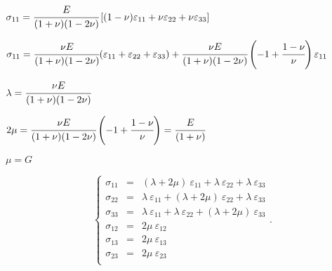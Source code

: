 \documentclass[onecolumn,11pt]{report}
\def\lthtmlcheckvsize{\ifdim\ht\sizebox<\vsize 
  \ifdim\wd\sizebox<\hsize\expandafter\hfill\fi \expandafter\vfill
  \else\expandafter\vss\fi}%
\begin{document}
{\newpage\clearpage
{}%
$\displaystyle \sigma_{11}  = \cfrac{E}{(1+\nu)(1-2\nu)}
\left[ (1-\nu) \varepsilon_{11} + \nu \varepsilon_{22} + \nu \varepsilon_{33} \right]$%
\lthtmlindisplaymathZ
\lthtmlcheckvsize\clearpage}

{\newpage\clearpage
{}%
$\displaystyle \sigma_{11}  = \cfrac{\nu E}{(1+\nu)(1-2\nu)}
(\varepsilon_{11} + \varepsilon_{22} + \varepsilon_{33})
+  \cfrac{\nu E}{(1+\nu)(1-2\nu)} \left( -1 + \cfrac{1-\nu}{\nu} \right) \varepsilon_{11}$%
\lthtmlindisplaymathZ
\lthtmlcheckvsize\clearpage}

{\newpage\clearpage
{}%
$\displaystyle \lambda = \cfrac{\nu E}{(1+\nu)(1-2\nu)}$%
\lthtmlindisplaymathZ
\lthtmlcheckvsize\clearpage}

{\newpage\clearpage
{}%
$\displaystyle 2\mu =  \cfrac{\nu E}{(1+\nu)(1-2\nu)} \left( -1 + \cfrac{1-\nu}{\nu} \right) = \cfrac{E}{(1+\nu)}$%
\lthtmlindisplaymathZ
\lthtmlcheckvsize\clearpage}

{\newpage\clearpage
{}%
$ \mu = G$%
\lthtmlindisplaymathZ
\lthtmlcheckvsize\clearpage}

{\newpage\clearpage
{}%
\begin{displaymath}\left\lbrace
\begin{array}{rcl}
\sigma_{11} & = & (\lambda + 2 \mu) \: \varepsilon_{11} + \lambda \: \varepsilon_{22} + \lambda \: \varepsilon_{33}\\
\sigma_{22} & = & \lambda \: \varepsilon_{11} + (\lambda + 2 \mu) \: \varepsilon_{22} + \lambda \: \varepsilon_{33}\\
\sigma_{33} & = & \lambda \: \varepsilon_{11} + \lambda \: \varepsilon_{22} + (\lambda + 2 \mu) \: \varepsilon_{33}\\
\sigma_{12} & = & 2 \mu \: \varepsilon_{12}\\
\sigma_{13} & = & 2 \mu \: \varepsilon_{13}\\
\sigma_{23} & = & 2 \mu \: \varepsilon_{23}\\
\end{array}
\right. \text{.}\end{displaymath}%
\lthtmldisplayZ
\lthtmlcheckvsize\clearpage}
\end{document}
